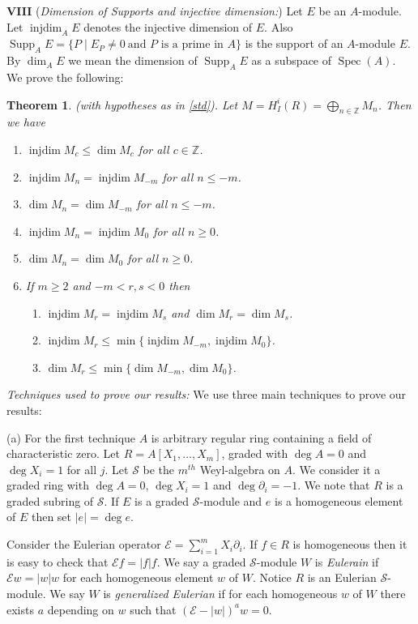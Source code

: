 \documentclass{amsart}
\newcommand{\ZZ}{\mathbb{Z} }
\newcommand{\E}{\mathcal{E} }
\newcommand{\Sc}{\mathcal{S} }
\newcommand{\Supp}{\operatorname{Supp}}
\newcommand{\injdim}{\operatorname{injdim}}
\newcommand{\Spec}{\operatorname{Spec}}
\theoremstyle{plain}
\newtheorem{theorem}{Theorem}[section]
\theoremstyle{definition}
\theoremstyle{remark}
\begin{document}
\textbf{VIII}
(\textit{Dimension of Supports  and injective dimension:}) Let $E$ be an $A$-module. Let
$\injdim_A E$ denotes the injective dimension of $E$. Also 
$\Supp_A E = \{ P \mid  E_P \neq 0 \ \text{and $P$ is a prime in $A$}\}$ is the support of an $A$-module $E$. 
By $\dim_A E $ we mean the dimension of $\Supp_A E$ as a subspace of $\Spec(A)$.
We prove the following:
\begin{theorem}\label{injdim-and-dim}(with hypotheses as in \ref{std}). Let $M = H^i_I(R) = \bigoplus_{n \in \ZZ}M_n$. Then we have
\begin{enumerate}[\rm (1)]
\item
$\injdim M_c \leq \dim M_c$ for all $c \in \ZZ$.
\item
$\injdim M_n = \injdim M_{-m}$ for all $n \leq -m$.
\item
$\dim M_n = \dim M_{-m}$ for all $n \leq -m$.
\item
$\injdim M_n = \injdim M_{0}$ for all $n \geq 0$.
\item
$\dim M_n = \dim M_{0}$ for all $n \geq 0$.
 \item
 If $m \geq 2$ and $-m < r,s < 0$ then
 \begin{enumerate}[\rm (a)]
 \item
 $\injdim M_r = \injdim M_{s}$  and $\dim M_r = \dim M_{s}$.
 \item
 $\injdim M_r \leq \min \{ \injdim M_{-m}, \injdim M_{0} \}$.
 \item
 $\dim M_r \leq \min \{ \dim M_{-m}, \dim M_{0} \}$.
 \end{enumerate}
\end{enumerate}
\end{theorem}

\emph{Techniques used to prove our results:}
We use three main techniques to prove our results:

\s \label{Weyl-mod}(a)  For the first  technique  $A$ is arbitrary regular ring containing a field of characteristic zero.  Let  $R = A[X_1,\ldots,X_m]$, graded with $\deg A = 0$ and $\deg X_i = 1$ for all $j$. Let $\Sc$ be the $m^{th}$ Weyl-algebra on $A$. We consider it a graded ring with $\deg A = 0$, $\deg X_i = 1$ and $\deg \partial_i = -1$. We note that $R$ is a graded subring of $\Sc$. If $E$ is a graded $\Sc$-module and $e$ is a homogeneous element of $E$ then set $|e| = \deg e$. 

Consider the Eulerian operator $\E = \sum_{i = 1}^{m} X_i \partial_i$. If $f \in R$ is homogeneous then it is easy to check that $\E f = |f| f$. We say a graded $\Sc$-module $W$ is \textit{Eulerain} if $\E w = |w| w$ for each homogeneous element $w$ of $W$. Notice $R$ is an Eulerian $\Sc$-module.  We say $W$ is \textit{generalized Eulerian} if for each
homogeneous $w$ of $W$ there exists $a$ depending on $w$ such that
$(\E - |w|)^aw = 0$.
\end{document}
